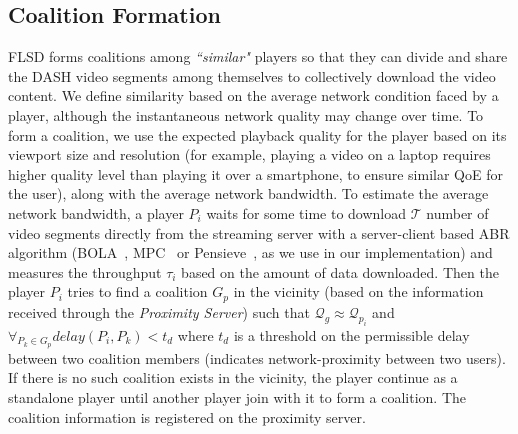
\subsection{Coalition Formation}
FLSD forms coalitions among \textit{``similar"} players so that they can divide and share the DASH video segments among themselves to collectively download the video content. We define similarity based on the average network condition faced by a player, although the instantaneous network quality may change over time. To form a coalition, we use the expected playback quality for the player based on its viewport size and resolution (for example, playing a video on a laptop requires higher quality level than playing it over a smartphone, to ensure similar QoE for the user), along with the average network bandwidth. To estimate the average network bandwidth, a player $P_i$ waits for some time to download $\mathcal{T}$ number of video segments directly from the streaming server with a server-client based ABR algorithm (BOLA~\cite{bola2-acm-mmsys2018}, MPC~\cite{MPC-SIGCOMM-2015} or Pensieve~\cite{Pensieve}, as we use in our implementation) and measures the throughput $\tau_i$ based on the amount of data downloaded. 
Then the player $P_i$ tries to find a coalition $G_p$ in the vicinity (based on the information received through the \textit{Proximity Server}) such that $\mathcal{Q}_g \approx \mathcal{Q}_{p_i}$ and $\forall_{P_k \in G_p} delay(P_i, P_k) < t_d$ where $t_d$ is a threshold on the permissible delay between two coalition members (indicates network-proximity between two users). If there is no such coalition exists in the vicinity, the player continue as a standalone player until another player join with it to form a coalition. The coalition information is registered on the proximity server. 
%
